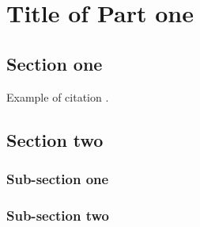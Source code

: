 

\chapter{Title of Part one}


\section{Section one}
Example of citation \cite{myRef1}.

\lipsum


\section{Section two}
\lipsum[1]

\subsection{Sub-section one}
\lipsum

\subsection{Sub-section two}
\lipsum

